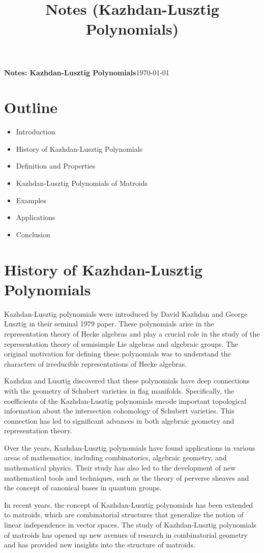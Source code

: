 \documentclass[10pt]{article}
\title{Notes (Kazhdan-Lusztig Polynomials)}
\theoremstyle{remark}
\begin{document}
{\textbf{Notes: Kazhdan-Lusztig Polynomials}}\hfill {\small{\today}}

\hrulefill

\section{Outline}
\begin{itemize}
    \item Introduction
    \item History of Kazhdan-Lusztig Polynomials
    \item Definition and Properties
    \item Kazhdan-Lusztig Polynomials of Matroids
    \item Examples
    \item Applications
    \item Conclusion
\end{itemize}

\section{History of Kazhdan-Lusztig Polynomials}
Kazhdan-Lusztig polynomials were introduced by David Kazhdan and George Lusztig in their seminal 1979 paper. These polynomials arise in the representation theory of Hecke algebras and play a crucial role in the study of the representation theory of semisimple Lie algebras and algebraic groups. The original motivation for defining these polynomials was to understand the characters of irreducible representations of Hecke algebras.

Kazhdan and Lusztig discovered that these polynomials have deep connections with the geometry of Schubert varieties in flag manifolds. Specifically, the coefficients of the Kazhdan-Lusztig polynomials encode important topological information about the intersection cohomology of Schubert varieties. This connection has led to significant advances in both algebraic geometry and representation theory.

Over the years, Kazhdan-Lusztig polynomials have found applications in various areas of mathematics, including combinatorics, algebraic geometry, and mathematical physics. Their study has also led to the development of new mathematical tools and techniques, such as the theory of perverse sheaves and the concept of canonical bases in quantum groups.

In recent years, the concept of Kazhdan-Lusztig polynomials has been extended to matroids, which are combinatorial structures that generalize the notion of linear independence in vector spaces. The study of Kazhdan-Lusztig polynomials of matroids has opened up new avenues of research in combinatorial geometry and has provided new insights into the structure of matroids.
\end{document}
